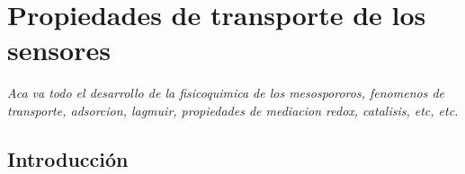  \newcommand{\NoBiblioEQ}[1]{
 \ifthenelse{\equal{#1}{verdadero}}{}{}
 \NoBiblioEQ{verdadero}}


 \FormatoCapituloDosLineas
 
 \chapter{Propiedades de transporte de los sensores}
 \label{chap:Electroquimica}

 \thispagestyle{empty}
	
 \noindent\textit{Aca va todo el desarrollo de la fisicoquimica de los mesospororos, fenomenos de  transporte, adsorcion, lagmuir, propiedades de mediacion redox, catalisis, etc, etc.}

 \vfill
 \minitoc
 \newpage

\section{Introducción}

